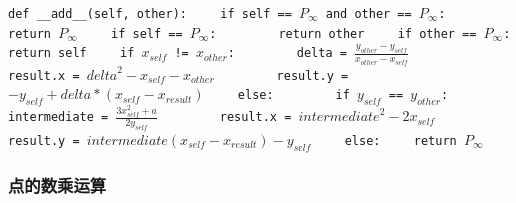 \documentclass[12pt,a4paper]{article}
\begin{document}
\lstinline{def __add__(self, other):}
\newline
\lstinline{    if self == }$ P_{\infty} $\lstinline{ and other == }$ P_{\infty} $\lstinline{:}
\newline
\lstinline{        return }$ P_{\infty} $
\newline
\lstinline{    if self == }$ P_{\infty} $\lstinline{:}
\newline
\lstinline{        return other}
\newline
\lstinline{    if other == }$ P_{\infty} $\lstinline{:}
\newline
\lstinline{        return self}
\newline
\lstinline{    if }$ x_{self} $\lstinline{ != }$ x_{other} $\lstinline{:}
\newline
\lstinline{        delta = }$ \frac{y_{other} - y_{self}}{x_{other} - x_{self}} $
\newline
\lstinline{        result.x = }$ {delta}^2 - x_{self} - x_{other} $
\newline
\lstinline{        result.y = }$ - y_{self} + delta * (x_{self} - x_{result}) $
\newline
\lstinline{    else:}
\newline
\lstinline{        if }$ y_{self} $\lstinline{ == }$ y_{other} $\lstinline{:}
\newline
\lstinline{        intermediate = }$ \frac{3x_{self}^2 + a}{2y_{self}} $
\newline
\lstinline{        result.x = }$ {intermediate}^2 - 2x_{self} $
\newline
\lstinline{        result.y = }$ {intermediate}(x_{self} - x_{result}) - y_{self} $
\newline
\lstinline{    else:}
\newline
\lstinline{    return }$ P_{\infty} $

\subsubsection*{点的数乘运算}
\end{document}
